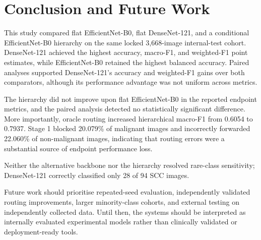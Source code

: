 \section{Conclusion and Future Work}
\label{sec:conclusion}

This study compared flat EfficientNet-B0, flat DenseNet-121, and a conditional
EfficientNet-B0 hierarchy on the same locked 3,668-image internal-test cohort.
DenseNet-121 achieved the highest accuracy, macro-F1, and weighted-F1 point
estimates, while EfficientNet-B0 retained the highest balanced accuracy.
Paired analyses supported DenseNet-121's accuracy and weighted-F1 gains
over both comparators, although its performance advantage was not uniform
across metrics.

The hierarchy did not improve upon flat EfficientNet-B0 in the reported
endpoint metrics, and the paired analysis detected no statistically
significant difference. More importantly, oracle routing increased
hierarchical macro-F1 from 0.6054 to 0.7937. Stage 1 blocked 20.079\% of malignant images and incorrectly
forwarded 22.060\% of non-malignant images, indicating that routing
errors were a substantial source of endpoint performance loss.

Neither the alternative backbone nor the hierarchy resolved rare-class
sensitivity; DenseNet-121 correctly classified only 28 of 94 SCC images.

Future work should prioritise repeated-seed evaluation, independently
validated routing improvements, larger minority-class cohorts, and external
testing on independently collected data. Until then, the systems should be
interpreted as internally evaluated experimental models rather than clinically
validated or deployment-ready tools.
